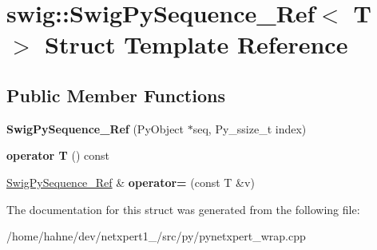 \hypertarget{structswig_1_1SwigPySequence__Ref}{}\section{swig\+:\+:Swig\+Py\+Sequence\+\_\+\+Ref$<$ T $>$ Struct Template Reference}
\label{structswig_1_1SwigPySequence__Ref}
\subsection*{Public Member Functions}
\begin{DoxyCompactItemize}
\item 
{\bfseries Swig\+Py\+Sequence\+\_\+\+Ref} (Py\+Object $\ast$seq, Py\+\_\+ssize\+\_\+t index)\hypertarget{structswig_1_1SwigPySequence__Ref_a54c91c58a08cd1545f4443db3b67598c}{}\label{structswig_1_1SwigPySequence__Ref_a54c91c58a08cd1545f4443db3b67598c}

\item 
{\bfseries operator T} () const \hypertarget{structswig_1_1SwigPySequence__Ref_aa35a6fb678b087e5b7c680a74ec31c6f}{}\label{structswig_1_1SwigPySequence__Ref_aa35a6fb678b087e5b7c680a74ec31c6f}

\item 
\hyperlink{structswig_1_1SwigPySequence__Ref}{Swig\+Py\+Sequence\+\_\+\+Ref} \& {\bfseries operator=} (const T \&v)\hypertarget{structswig_1_1SwigPySequence__Ref_a71732475dadcaebf7e61bd5377199ee2}{}\label{structswig_1_1SwigPySequence__Ref_a71732475dadcaebf7e61bd5377199ee2}

\end{DoxyCompactItemize}


The documentation for this struct was generated from the following file\+:\begin{DoxyCompactItemize}
\item 
/home/hahne/dev/netxpert1\+\_/src/py/pynetxpert\+\_\+wrap.\+cpp\end{DoxyCompactItemize}
